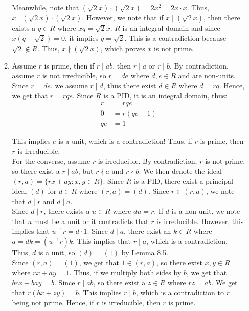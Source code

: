 \documentclass{article}
\begin{document}
\begin{enumerate}
\begin{enumerate}
    Meanwhile, note that $(\sqrt{2}x) \cdot (\sqrt{2}x) = 2x^2 = 2x \cdot x$. Thus, $x \mid (\sqrt{2}x) \cdot (\sqrt{2}x)$. However, we note that if $x \mid (\sqrt{2}x)$, then there exists a $q \in R$ where $xq = \sqrt{2}x$. $R$ is an integral domain and since $x(q - \sqrt{2}) = 0$, it implies $q = \sqrt{2}$. This is a contradiction because $\sqrt{2} \notin R$. Thus, $x \nmid (\sqrt{2}x)$, which proves $x$ is not prime. \\

    \item 
    Assume $r$ is prime, then if $r \mid ab$, then $r \mid a$ or $r \mid b$. By contradiction, assume $r$ is not irreducible, so $r = de$ where $d, e \in R$ and are non-units. Since $r = de$, we assume $r \mid d$, thus there exist $d \in R$ where $d = rq$. Hence, we get that $r = rqe$. Since $R$ is a PID, it is an integral domain, thus: 
    \begin{align*}
        r &= rqe \\
        0 &= r(qe -1) \\
        qe &= 1
    \end{align*}

    This implies $e$ is a unit, which is a contradiction! Thus, if $r$ is prime, then $r$ is irreducible. \\

    For the converse, assume $r$ is irreducible. By contradiction, $r$ is not prime, so there exist a $r \mid ab$, but $r \nmid a$ and $r \nmid b$. We then denote the ideal $(r, a) = \{rx + ay: x, y \in R \}$. Since $R$ is a PID, there exist a principal ideal $(d)$ for $d \in R$ where $(r, a) = (d)$. Since $r \in (r, a)$, we note that $d \mid r$ and $d \mid a$. \\

    Since $d \mid r$, there exists a $u \in R$ where $du = r$. If $d$ is a non-unit, we note that $u$ must be a unit or it contradicts that $r$ is irreducible. However, this implies that $u^{-1}r = d \cdot 1$. Since $d \mid a$, there exist an $k \in R$ where $a = dk = (u^{-1}r)k$. This implies that $r \mid a$, which is a contradiction. Thus, $d$ is a unit, so $(d) = (1)$ by Lemma 8.5. \\

    Since $(r, a) = (1)$, we get that $1 \in (r,a)$, so there exist $x, y \in R$ where $rx + ay = 1$. Thus, if we multiply both sides by $b$, we get that $brx + bay = b$. Since $r \mid ab$, so there exist a $z \in R$ where $rz = ab$. We get that $r(bx + zy) = b$. This implies $r\mid b$, which is a contradiction to $r$ being not prime. Hence, if $r$ is irreducible, then $r$ is prime. 
\end{enumerate}




\end{enumerate}
\end{document}
